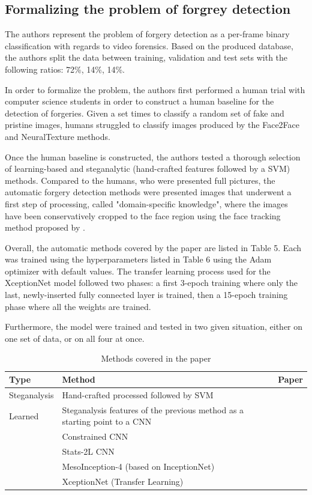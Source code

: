 \documentclass{article} %
\begin{document}
\subsection{Formalizing the problem of forgrey detection}

The authors represent the problem of forgery detection as a per-frame binary classification with regards to video forensics. Based on the produced database, the authors split the data between training, validation and test sets with the following ratios: 72\%, 14\%, 14\%.

In order to formalize the problem, the authors first performed a human trial with computer science students in order to construct a human baseline for the detection of forgeries. Given a set times to classify a random set of fake and pristine images, humans struggled to classify images produced by the Face2Face and NeuralTexture methods. 

Once the human baseline is constructed, the authors tested a thorough selection of learning-based and steganalytic (hand-crafted features followed by a SVM) methods. Compared to the humans, who were presented full pictures, the automatic forgery detection methods were presented images that underwent a first step of processing, called "domain-specific knowledge", where the images have been conservatively cropped to the face region using the face tracking method proposed by \cite{thies2020face2face}.

Overall, the automatic methods covered by the paper are listed in Table 5. Each was trained using the hyperparameters listed in Table 6 using the Adam optimizer with default values. The transfer learning process used for the XceptionNet model followed two phases: a first 3-epoch training where only the last, newly-inserted fully connected layer is trained, then a 15-epoch training phase where all the weights are trained.

Furthermore, the model were trained and tested in two given situation, either on one set of data, or on all four at once.

\begin{table}[h!]
\centering
\begin{tabular}{ |p{2cm}|p{7cm}|p{4cm}| }
 \hline
 \textbf{Type} & \textbf{Method} & \textbf{Paper} \\
 \hline
 Steganalysis & Hand-crafted processed followed by SVM & \cite{6197267} \\
 Learned & Steganalysis features of the previous method as a starting point to a CNN & \cite{10.1145/3082031.3083247} \\
  & Constrained CNN & \cite{8335799} \\
  & Stats-2L CNN & \cite{8267647} \\
  & MesoInception-4 (based on InceptionNet) & \cite{8630761} \\
  & XceptionNet (Transfer Learning) & \cite{8099678} \\
 \hline
\end{tabular}
\caption{Methods covered in the paper}
\end{table}
\end{document}
